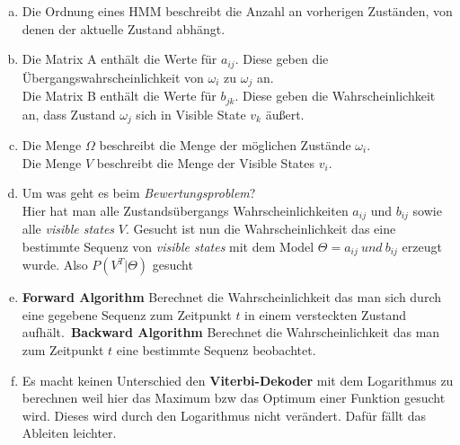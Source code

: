 \documentclass[a4paper]{scrartcl}
\begin{document}
\begin{enumerate}[(a)]
	\item Die Ordnung eines HMM beschreibt die Anzahl an vorherigen Zuständen, von denen der aktuelle Zustand abhängt.
	
	\item Die Matrix A enthält die Werte für $a_{ij}$. Diese geben die Übergangswahrscheinlichkeit von $\omega_i$ zu $\omega_j$ an.\\
	
	Die Matrix B enthält die Werte für $b_{jk}$. Diese geben die Wahrscheinlichkeit an, dass Zustand $\omega_j$ sich in Visible State $v_k$ äußert.\\
	
	\item Die Menge $\Omega$ beschreibt die Menge der möglichen Zustände $\omega_i$.\\
	
	Die Menge $V$ beschreibt die Menge der Visible States $v_i$.
	\item Um was geht es beim \textit{Bewertungsproblem}? \\
Hier hat man alle Zustandsübergangs Wahrscheinlichkeiten $a_{ij}$ und $b_{ij}$  sowie alle \textit{visible states} $V$. Gesucht ist nun die Wahrscheinlichkeit das eine bestimmte Sequenz von \textit{visible states} mit dem Model $\Theta =   a_{ij}\ und\ b_{ij}$ erzeugt wurde. Also $P(V^T|\Theta)$ gesucht
	\item \textbf{Forward Algorithm} Berechnet die Wahrscheinlichkeit das man sich durch eine gegebene Sequenz zum Zeitpunkt $t$ in einem versteckten Zustand aufhält.\
	\textbf{Backward Algorithm} Berechnet die Wahrscheinlichkeit das man zum Zeitpunkt $t$ eine bestimmte Sequenz beobachtet. 
	\item Es macht keinen Unterschied den \textbf{Viterbi-Dekoder} mit dem Logarithmus zu berechnen weil hier das Maximum bzw das Optimum einer Funktion gesucht wird. Dieses wird durch den Logarithmus nicht verändert. Dafür fällt das Ableiten leichter.

\end{enumerate}
\end{document}
